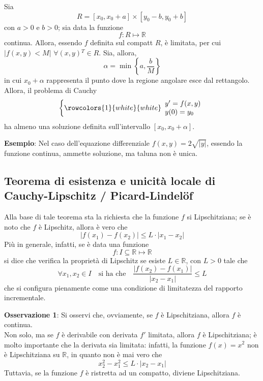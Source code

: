 \documentclass[a4paper]{extarticle}
\begin{document}
\vspace{2em}
\noindent
Sia
\[R = \left[x_0,x_0+a\right] \times \left[y_0-b,y_0+b\right]\]
con $a>0$ e $b>0$; sia data la funzione
\[f : R \longmapsto \mathbb{R}\] 
continua. Allora, essendo $f$ definita sul compatt $R$, è limitata, per cui $\left\vert f(x,y) < M \right\vert$ $\forall (x,y){^T} \in R$. Sia, allora,
\[\alpha = \min \left\{a,\dfrac{b}{M}\right\}\]
in cui $x_0+\alpha$ rappresenta il punto dove la regione angolare esce dal rettangolo.\\
Allora, il problema di Cauchy
\[\left\{
    \rowcolors{1}{white}{white}
    \begin{array}{lll}
        y'=f(x,y)\\
        y(0)=y_0
    \end{array}
\right.\]
ha almeno una soluzione definita sull'intervallo $\left[x_0,x_0+\alpha\right]$.

\vspace{2em}
\noindent
\textbf{Esempio}: Nel caso dell'equazione differenziale $f(x,y) = 2 \sqrt{\vert y\vert}$, essendo la funzione continua, ammette soluzione, ma taluna non è unica.

\vspace{1em}
\subsection{Teorema di esistenza e unicità locale di Cauchy-Lipschitz / Picard-Lindelöf}
Alla base di tale teorema sta la richiesta che la funzione $f$ si Lipschitziana; se è noto che $f$ è Lipschitz, allora è vero che
\[\left\vert f(x_1) - f(x_2) \right\vert \leq L \cdot \left\vert x_1 - x_2 \right\vert\]
Più in generale, infatti, se è data una funzione
\[f : I \subseteq \mathbb{R} \longmapsto \mathbb{R}\]
si dice che verifica la proprietà di Lipschitz se esiste $L \in \mathbb{R}$, con $L>0$ tale che
\[\forall x_1,x_2 \in I \hspace{1em} \text{si ha che} \hspace{1em} \dfrac{\left\vert f(x_2)-f(x_1)\right\vert}{\left\vert x_2-x_1 \right\vert} \leq L\]
che si configura pienamente come una condizione di limitatezza del rapporto incrementale.

\vspace{2em}
\noindent
\textbf{Osservazione 1}: Si osservi che, ovviamente, se $f$ è Lipschitziana, allora $f$ è continua.\\
Non solo, ma se $f$ è derivabile con derivata $f'$ limitata, allora $f$ è Lipschitziana; è molto importante che la derivata sia limitata: infatti, la funzione $f(x)=x^2$ non è Lipschitziana su $\mathbb{R}$, in quanto non è mai vero che
\[x_2^2 - x_1^2 \leq L \cdot \left \vert x_2 - x_1 \right \vert\]
Tuttavia, se la funzione $f$ è ristretta ad un compatto, diviene Lipschitziana.
\end{document}
